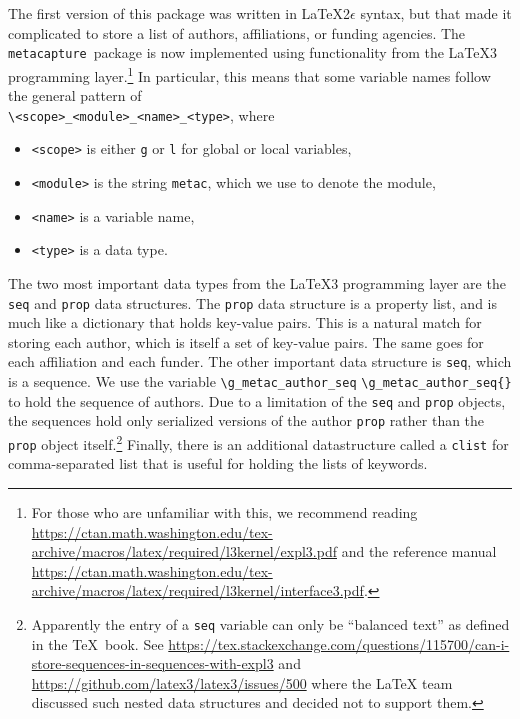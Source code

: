 \documentclass{article}
\newcommand{\pkgname}{\texttt{metacapture}}
\newcommand{\cmd}[2][]{%
  \def\FirstArg{#1}%
  \ifx\FirstArg\empty%
    \texttt{\textbackslash{}#2}%
  \else%
    \texttt{\textbackslash{}#2\{#1\}}%
  \fi
}
\begin{document}
The first version of this package was written in LaTeX2$\epsilon$
syntax, but that made it complicated to store a list of authors,
affiliations, or funding agencies.  The \pkgname\ package is now
implemented using functionality from the LaTeX3 programming
layer.\footnote{For those who are unfamiliar with this, we recommend
reading \url{https://ctan.math.washington.edu/tex-archive/macros/latex/required/l3kernel/expl3.pdf}
and the reference
manual \url{https://ctan.math.washington.edu/tex-archive/macros/latex/required/l3kernel/interface3.pdf}.}
In particular, this means that some variable names follow the
general pattern of\\
\texttt{\textbackslash\textless{scope}\textgreater\_\textless{module}\textgreater\_\textless{name}\textgreater\_\textless{type}\textgreater},
where
\begin{itemize}
\setlength\itemsep{0pt}
\item \texttt{\textless{scope}\textgreater} is either \texttt{g} or \texttt{l} for global or local variables,
\item \texttt{\textless{module}\textgreater} is the string \texttt{metac}, which we use to denote the module,
\item \texttt{\textless{name}\textgreater} is a variable name,
\item \texttt{\textless{type}\textgreater} is a data type.
\end{itemize}
The two most important data types from the LaTeX3 programming layer
are the \texttt{seq} and \texttt{prop} data
structures. The \texttt{prop} data structure is a property list, and
is much like a dictionary that holds key-value pairs.  This is a
natural match for storing each author, which is itself a set of
key-value pairs.  The same goes for each affiliation and each funder.
The other important data structure is \texttt{seq}, which is a
sequence. We use the variable
\cmd{g\_metac\_author\_seq} to hold the sequence of authors.
Due to a limitation of the \texttt{seq} and \texttt{prop} objects, the
sequences hold only serialized versions of the author \texttt{prop}
rather than the \texttt{prop} object itself.\footnote{Apparently the
entry of a \texttt{seq} variable can only be ``balanced text'' as
defined in the \TeX\ book.
See \url{https://tex.stackexchange.com/questions/115700/can-i-store-sequences-in-sequences-with-expl3}
and \url{https://github.com/latex3/latex3/issues/500} where the LaTeX
team discussed such nested data structures and decided not to support them.}
Finally, there is an additional datastructure called a \texttt{clist}
for comma-separated list that is useful for holding the lists of
keywords.
\end{document}
